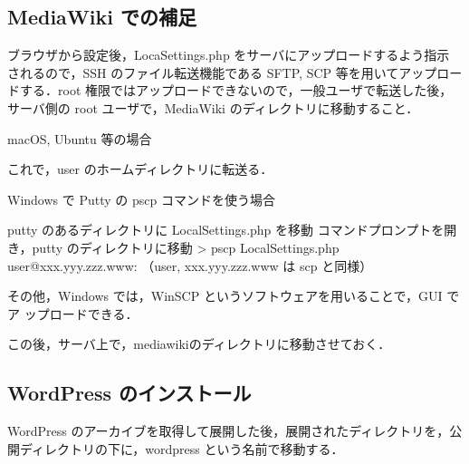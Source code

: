 \subsection*{MediaWiki での補足}

ブラウザから設定後，LocaSettings.php をサーバにアップロードするよう指示
されるので，SSH のファイル転送機能である SFTP, SCP 等を用いてアップロー
ドする．root 権限ではアップロードできないので，一般ユーザで転送した後，
サーバ側の root ユーザで，MediaWiki のディレクトリに移動すること．

macOS, Ubuntu 等の場合
これで，user のホームディレクトリに転送る．

Windows で Putty の pscp コマンドを使う場合
\begin{cli}
putty のあるディレクトリに LocalSettings.php を移動
コマンドプロンプトを開き，putty のディレクトリに移動
> pscp LocalSettings.php user@xxx.yyy.zzz.www:
（user, xxx.yyy.zzz.www は scp と同様）
\end{cli}
その他，Windows では，WinSCP というソフトウェアを用いることで，GUI でア
ップロードできる．

この後，サーバ上で，mediawikiのディレクトリに移動させておく．

\subsection{WordPress のインストール}
WordPress のアーカイブを取得して展開した後，展開されたディレクトリを，公
開ディレクトリの下に，wordpress という名前で移動する．

